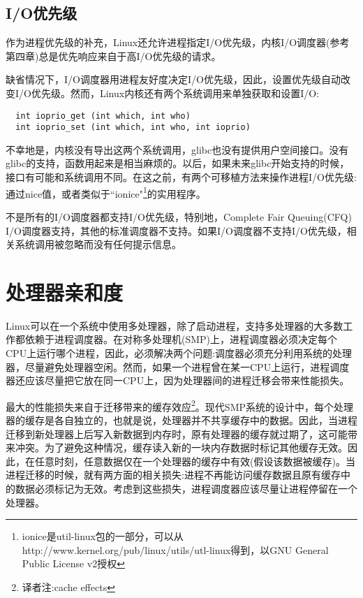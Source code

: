 \subsection{I/O优先级}

作为进程优先级的补充，Linux还允许进程指定I/O优先级，内核I/O调度器(参考第四章)总是优先响应来自于高I/O优先级的请求。

缺省情况下，I/O调度器用进程友好度决定I/O优先级，因此，设置优先级自动改变I/O优先级。然而，Linux内核还有两个系统调用来单独获取和设置I/O:

\begin{lstlisting}
  int ioprio_get (int which, int who)
  int ioprio_set (int which, int who, int ioprio)
\end{lstlisting}

不幸地是，内核没有导出这两个系统调用，glibc也没有提供用户空间接口。没有glibc的支持，函数用起来是相当麻烦的。以后，如果未来glibc开始支持的时候，接口有可能和系统调用不同。在这之前，有两个可移植方法来操作进程I/O优先级:通过nice值，或者类似于``ionice"\footnote[1]{ionice是util-linux包的一部分，可以从http://www.kernel.org/pub/linux/utils/utl-linux得到，以GNU General Public License v2授权}的实用程序。

不是所有的I/O调度器都支持I/O优先级，特别地，Complete Fair Queuing(CFQ) I/O调度器支持，其他的标准调度器不支持。如果I/O调度器不支持I/O优先级，相关系统调用被忽略而没有任何提示信息。

\section{处理器亲和度}

Linux可以在一个系统中使用多处理器，除了启动进程，支持多处理器的大多数工作都依赖于进程调度器。在对称多处理机(SMP)上，进程调度器必须决定每个CPU上运行哪个进程，因此，必须解决两个问题:调度器必须充分利用系统的处理器，尽量避免处理器空闲。然而，如果一个进程曾在某一CPU上运行，进程调度器还应该尽量把它放在同一CPU上，因为处理器间的进程迁移会带来性能损失。

最大的性能损失来自于迁移带来的缓存效应\footnote[2]{译者注:cache effects}。现代SMP系统的设计中，每个处理器的缓存是各自独立的，也就是说，处理器并不共享缓存中的数据。因此，当进程迁移到新处理器上后写入新数据到内存时，原有处理器的缓存就过期了，这可能带来冲突。为了避免这种情况，缓存读入新的一块内存数据时标记其他缓存无效。因此，在任意时刻，任意数据仅在一个处理器的缓存中有效(假设该数据被缓存)。当进程迁移的时候，就有两方面的相关损失:进程不再能访问缓存数据且原有缓存中的数据必须标记为无效。考虑到这些损失，进程调度器应该尽量让进程停留在一个处理器。

